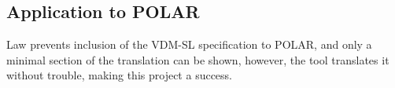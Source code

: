\subsection{Application to POLAR}
Law prevents inclusion of the VDM-SL specification to POLAR, and only a minimal section of the translation can be shown, however, the tool translates it without trouble, making this project a success.

\begin{lstlisting}[language=Isabelle]

\end{lstlisting}